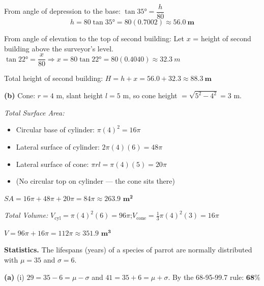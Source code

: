 \documentclass[addpoints]{exam}
\begin{document}
\begin{questions}
\begin{solution}[11cm]
From angle of depression to the base: $\tan\ang{35} = \dfrac{h}{80}$
\[h = 80\tan\ang{35} = 80(0.7002) \approx \mathbf{\SI{56.0}{m}}\]

From angle of elevation to the top of second building:
Let $x$ = height of second building above the surveyor's level.
$\tan\ang{22} = \dfrac{x}{80} \Rightarrow x = 80\tan\ang{22} = 80(0.4040) \approx \SI{32.3}{m}$

Total height of second building: $H = h + x = 56.0 + 32.3 \approx \mathbf{\SI{88.3}{m}}$

\textbf{(b)} Cone: $r = 4$ m, slant height $l = 5$ m, so cone height $= \sqrt{5^2-4^2} = 3$ m.

\textit{Total Surface Area:}
\begin{itemize}
\item Circular base of cylinder: $\pi(4)^2 = 16\pi$
\item Lateral surface of cylinder: $2\pi(4)(6) = 48\pi$
\item Lateral surface of cone: $\pi r l = \pi(4)(5) = 20\pi$
\item (No circular top on cylinder — the cone sits there)
\end{itemize}
$SA = 16\pi + 48\pi + 20\pi = 84\pi \approx \mathbf{263.9 \text{ m}^2}$

\textit{Total Volume:}
$V_{\text{cyl}} = \pi(4)^2(6) = 96\pi$;\quad $V_{\text{cone}} = \tfrac{1}{3}\pi(4)^2(3) = 16\pi$

$V = 96\pi + 16\pi = 112\pi \approx \mathbf{351.9 \text{ m}^3}$
\end{solution}

\question[8] \textbf{Statistics.}
The lifespans (years) of a species of parrot are normally distributed with $\mu = 35$ and $\sigma = 6$.
\begin{solution}[11cm]
\textbf{(a)}
(i) $29 = 35 - 6 = \mu - \sigma$ and $41 = 35 + 6 = \mu + \sigma$. By the 68-95-99.7 rule: $\mathbf{68\%}$


\end{solution}
\end{questions}
\end{document}
